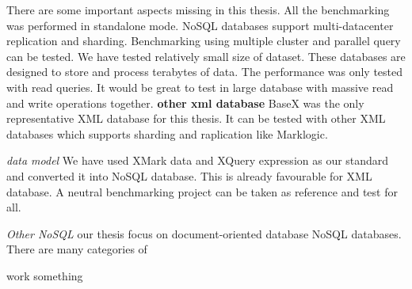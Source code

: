 There are some important aspects missing in this thesis. All the benchmarking was performed in standalone mode. NoSQL databases support multi-datacenter replication and sharding. Benchmarking using multiple cluster and parallel query can be tested. We have tested relatively small size of dataset. These databases are designed to store and process terabytes of data. The performance was only tested with read queries. It would be great to test in large database with massive read and write operations together. 
\textbf{other xml database }
BaseX was the only representative XML database for this thesis. It can be tested with other XML databases which supports sharding and  raplication like Marklogic. 

\textit{data model} 
We have used XMark data and XQuery expression as our standard and converted it into NoSQL database. This is already favourable for XML database. A neutral benchmarking project can be taken as reference and test for all. 

\textit{Other NoSQL} 
our thesis focus on document-oriented database NoSQL databases. There are many categories of

work something 
